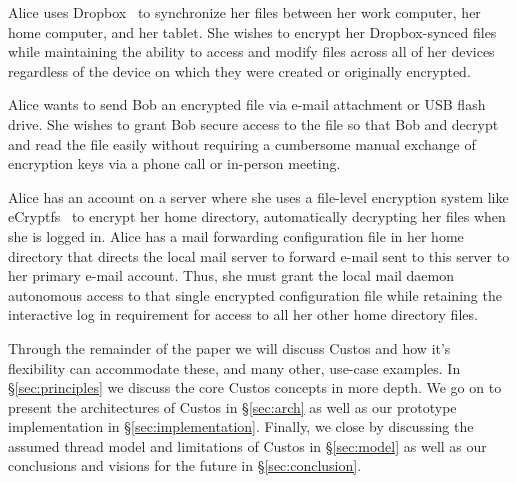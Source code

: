 \begin{packed_desc}
\item[Secure Multi-Devices Access:] Alice uses Dropbox~\cite{dropbox} to
  synchronize her files between her work computer, her home computer,
  and her tablet. She wishes to encrypt her Dropbox-synced files
  while maintaining the ability to access and modify files across all
  of her devices regardless of the device on which they were created
  or originally encrypted.
\item[Secure Out-of-Band Sharing:] Alice wants to send Bob an
  encrypted file via e-mail attachment or USB flash drive. She wishes
  to grant Bob secure access to the file so that Bob and decrypt and
  read the file easily without requiring a cumbersome manual exchange
  of encryption keys via a phone call or in-person meeting.
\item[Secure Autonomous Access:] Alice has an account on a server
  where she uses a file-level encryption system like
  eCryptfs~\cite{eCryptfs} to encrypt her home directory,
  automatically decrypting her files when she is logged in. Alice has
  a mail forwarding configuration file in her home directory that
  directs the local mail server to forward e-mail sent to this server
  to her primary e-mail account. Thus, she must grant the local mail
  daemon autonomous access to that single encrypted configuration file
  while retaining the interactive log in requirement for access to all
  her other home directory files.
\end{packed_desc}

Through the remainder of the paper we will discuss Custos and how it's
flexibility can accommodate these, and many other, use-case
examples. In \S \ref{sec:principles} we discuss the core Custos
concepts in more depth. We go on to present the architectures of
Custos in \S \ref{sec:arch} as well as our prototype implementation in
\S \ref{sec:implementation}. Finally, we close by discussing the assumed thread
model and limitations of Custos in \S \ref{sec:model} as well as our
conclusions and visions for the future in \S \ref{sec:conclusion}.
